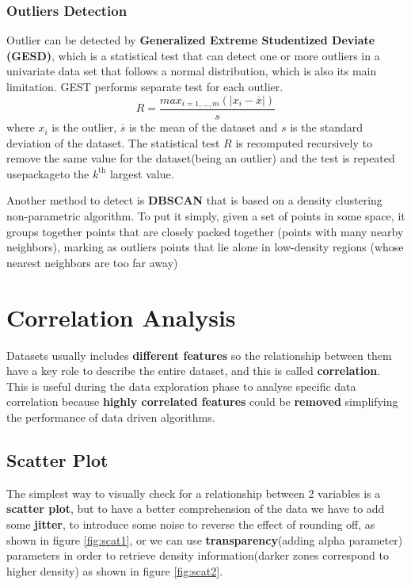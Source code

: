 \subsubsection{Outliers Detection}
Outlier can be detected by \textbf{Generalized Extreme Studentized
Deviate (GESD)}, which is a statistical test that can detect one or 
more outliers in a univariate data set that follows a normal 
distribution, which is also its main limitation.
GEST performs separate test for each outlier.
\begin{equation*}
  R = \dfrac{max_{i=1,\dots,m}(|x_i - \overline{x}|)}{s}
\end{equation*}
where $x_i$ is the outlier, $\overline{s}$ is the mean of the dataset 
and $s$ is the standard deviation of the dataset.
The statistical test $R$ is recomputed recursively to remove the same 
value for the dataset(being an outlier) and the test is repeated
usepackageto the $k^{\text{th}}$ largest value.


Another method to detect is \textbf{DBSCAN} that is based on a density
clustering non-parametric algorithm. To put it simply, given a set of
points in some space, it groups together points that are closely
packed together (points with many nearby neighbors), marking as
outliers points that lie alone in low-density regions (whose nearest
neighbors are too far away)

\section{Correlation Analysis}
Datasets usually includes \textbf{different features} so the
relationship between them have a key role to describe the entire
dataset, and this is called \textbf{correlation}. This is useful
during the data exploration phase to analyse specific data
correlation because \textbf{highly correlated features} could be
\textbf{removed} simplifying the performance of data driven
algorithms.

\subsection{Scatter Plot}
The simplest way to visually check for a relationship between 2
variables is a \textbf{scatter plot}, but to have a better
comprehension of the data we have to add some \textbf{jitter}, to
introduce some noise to reverse the effect of rounding off, as shown
in figure \ref{fig:scat1}, or we can use \textbf{transparency}(adding
alpha parameter) parameters in order to retrieve density
information(darker zones correspond to higher density) as shown in
figure \ref{fig:scat2}.

